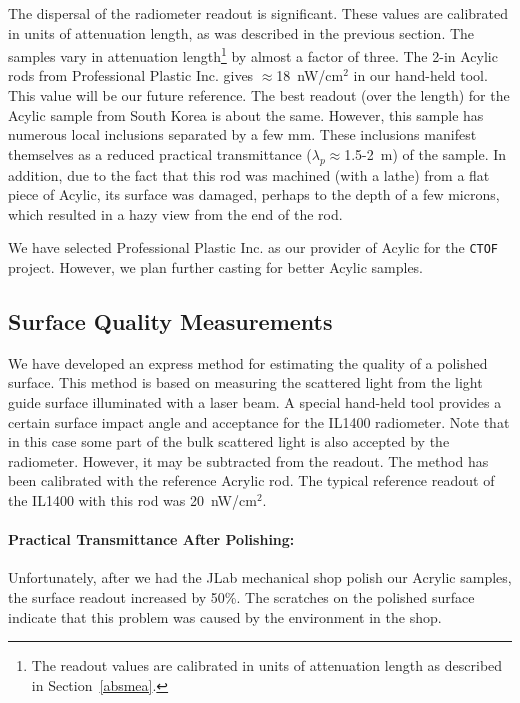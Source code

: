 The dispersal of the radiometer readout is significant.  These values are 
calibrated in units of attenuation length, as was described in the previous 
section.  The samples vary in attenuation length\footnote{The readout values 
are calibrated in units of attenuation length as described in Section~\ref{absmea}.} 
by almost a factor of three.  The 2-in Acylic rods from Professional Plastic Inc.
gives $\approx$18~nW/cm$^2$ in our hand-held tool.  This value will be our future 
reference.  The best readout (over the length) for the Acylic sample from South 
Korea is about the same.  However, this sample has numerous local inclusions 
separated by a few mm.  These inclusions manifest themselves as a reduced 
practical transmittance ($\lambda_p \approx$1.5-2~m) of the sample.  In addition, 
due to the fact that this rod was machined (with a lathe) from a flat piece of  
Acylic, its surface was damaged, perhaps to the depth of a few microns, which 
resulted in a hazy view from the end of the rod.    

We have selected Professional Plastic Inc. as our provider of Acylic for the 
{\tt CTOF} project.  However, we plan further casting for better Acylic samples.

\subsection{Surface Quality Measurements}

We have developed an express method for estimating the quality of a polished surface.  
This method is based on measuring the scattered light from the light guide surface 
illuminated with a laser beam.  A special hand-held tool provides a certain surface 
impact angle and acceptance for the IL1400 radiometer.   Note that in this case some 
part of the bulk scattered light is also accepted by the radiometer.  However, it may 
be subtracted from the readout.  The method has been calibrated with the reference 
Acrylic rod.  The typical reference readout of the IL1400 with this rod was 
20~nW/cm$^2$.  

\paragraph{Practical Transmittance After Polishing:}
Unfortunately, after we had the JLab mechanical shop polish our Acrylic samples, 
the surface readout increased by 50\%.  The scratches on the polished surface
indicate that this problem was caused by the environment in the shop.

